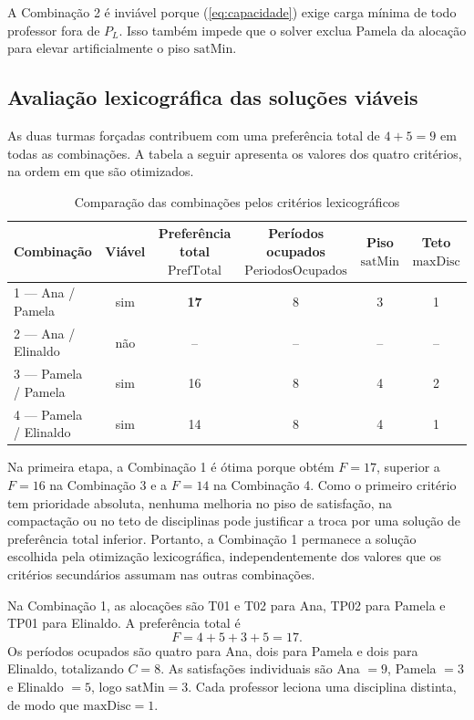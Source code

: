 \documentclass[11pt,a4paper]{article}
\begin{document}
A Combinação 2 é inviável porque (\ref{eq:capacidade}) exige carga mínima de todo professor fora de $P_L$. Isso também impede que o solver exclua Pamela da alocação para elevar artificialmente o piso $\mathrm{satMin}$.

\subsection{Avaliação lexicográfica das soluções viáveis}

As duas turmas forçadas contribuem com uma preferência total de $4+5=9$ em todas as combinações. A tabela a seguir apresenta os valores dos quatro critérios, na ordem em que são otimizados.

\begin{table}[htbp]
\centering
\caption{Comparação das combinações pelos critérios lexicográficos}
\label{tab:resumo_final}
\small
\begin{tabular}{lccccc}
\toprule
Combinação & Viável & Preferência total $\mathrm{PrefTotal}$ & Períodos ocupados $\mathrm{PeriodosOcupados}$ & Piso $\mathrm{satMin}$ & Teto $\mathrm{maxDisc}$\\
\midrule
1 --- Ana / Pamela      & sim & \textbf{17} & 8 & 3 & 1 \\
2 --- Ana / Elinaldo    & não & -- & -- & -- & -- \\
3 --- Pamela / Pamela   & sim & 16 & 8 & 4 & 2 \\
4 --- Pamela / Elinaldo & sim & 14 & 8 & 4 & 1 \\
\bottomrule
\end{tabular}
\end{table}

Na primeira etapa, a Combinação 1 é ótima porque obtém $F=17$, superior a $F=16$ na Combinação 3 e a $F=14$ na Combinação 4. Como o primeiro critério tem prioridade absoluta, nenhuma melhoria no piso de satisfação, na compactação ou no teto de disciplinas pode justificar a troca por uma solução de preferência total inferior. Portanto, a Combinação 1 permanece a solução escolhida pela otimização lexicográfica, independentemente dos valores que os critérios secundários assumam nas outras combinações.

Na Combinação 1, as alocações são T01 e T02 para Ana, TP02 para Pamela e TP01 para Elinaldo. A preferência total é
\[
F=4+5+3+5=17.
\]
Os períodos ocupados são quatro para Ana, dois para Pamela e dois para Elinaldo, totalizando $C=8$. As satisfações individuais são Ana $=9$, Pamela $=3$ e Elinaldo $=5$, logo $\mathrm{satMin}=3$. Cada professor leciona uma disciplina distinta, de modo que $\mathrm{maxDisc}=1$.
\end{document}
